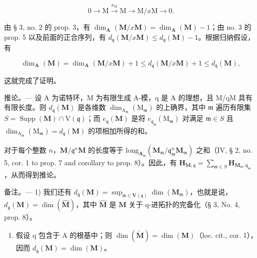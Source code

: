 \[
0 \longrightarrow \mathrm{M} \xrightarrow {x _ {\mathrm{M}}} \mathrm{M} \longrightarrow \mathrm{M} / x \mathrm{M} \longrightarrow 0.
\]

由 § 3, no. 2 的 prop. 3，有 \(\dim_{\mathbf{A}}(\mathbf{M}/x\mathbf{M}) = \dim_{\mathbf{A}}(\mathbf{M}) - 1\)；由 no. 3 的 prop. 5 以及前面的正合序列，有 \(d_{\mathfrak{q}}(\mathbf{M}/x\mathbf{M}) \leqslant d_{\mathfrak{q}}(\mathbf{M}) - 1\)。根据归纳假设，有

\[
\dim_ {\mathbf {A}} (\mathbf {M}) = \dim_ {\mathbf {A}} (\mathbf {M} / x \mathbf {M}) + 1 \leqslant d _ {\mathfrak {q}} (\mathbf {M} / x \mathbf {M}) + 1 \leqslant d _ {\mathfrak {q}} (\mathbf {M}),
\]

这就完成了证明。

推论。--- 设 A 为诺特环，M 为有限生成 A-模，q 是 A 的理想，且 M/qM 具有有限长度。则 \(d_{\mathfrak{q}}(\mathbf{M})\) 是各维数 \(\dim_{\mathrm{A}_{\mathfrak{m}}}\left(\mathrm{M}_{\mathfrak{m}}\right)\) 的上确界，其中 \(\mathfrak{m}\) 遍历有限集 \(S = \operatorname{Supp}(\mathbf{M}) \cap \mathrm{V}(\mathfrak{q})\)；而 \(e_{\mathfrak{q}}(\mathbf{M})\) 是将 \(e_{\mathfrak{q}_{\mathfrak{m}}}\left(\mathrm{M}_{\mathfrak{m}}\right)\) 对满足 \(\mathfrak{m}\in S\) 且 \(\dim_{\mathrm{A}_{\mathfrak{m}}}\left(\mathrm{M}_{\mathfrak{m}}\right) = d_{\mathfrak{q}}(\mathbf{M})\) 的项相加所得的和。

对于每个整数 \(n\)，\(\mathbf{M} / \mathfrak{q}^n\mathbf{M}\) 的长度等于 \(\mathrm{long}_{\mathbf{A}_{\mathfrak{m}}}(\mathbf{M}_{\mathfrak{m}} / \mathfrak{q}_{\mathfrak{m}}^n\mathbf{M}_{\mathfrak{m}})\) 之和（IV, § 2, no. 5, cor. 1 to prop. 7 and corollary to prop. 8）。因此，有 \(\mathbf{H}_{\mathbf{M},\mathfrak{q}} = \sum_{\mathfrak{m}\in S}\mathbf{H}_{\mathbf{M}_{\mathfrak{m}},\mathfrak{q}_{\mathfrak{m}}}\)，从而得到推论。

备注。--- 1) 我们还有 \(d_{\mathfrak{q}}(\mathbf{M}) = \sup_{\mathfrak{m} \in \mathbf{V}(\mathfrak{q})} \dim(\mathbf{M}_{\mathfrak{m}})\)，也就是说，\(d_{\mathfrak{q}}(\mathbf{M}) = \dim(\hat{\mathbf{M}})\)，其中 \(\hat{\mathbf{M}}\) 是 \(\mathbf{M}\) 关于 q-进拓扑的完备化（§ 3, No. 4, prop. 8）。

\begin{enumerate}
\def\labelenumi{\arabic{enumi})}
\setcounter{enumi}{1}
\tightlist
\item
  假设 q 包含于 A 的根基中；则 \(\dim(\tilde{\mathbf{M}})=\dim(\mathbf{M})\)（loc. cit., cor. 1），因而 \(d_{\mathfrak{q}}(\mathbf{M})=\dim(\mathbf{M})\)。
\end{enumerate}

